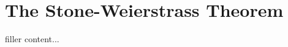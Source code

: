 \documentclass[../../templates/section]{subfiles}
\begin{document}
\section{The Stone-Weierstrass Theorem}\label{sec:the-stone-weierstrass-theorem}

filler content...
\end{document}
